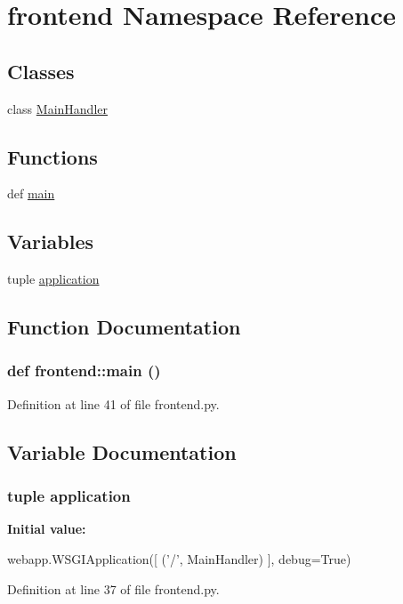 \hypertarget{namespacefrontend}{
\section{frontend Namespace Reference}
\label{namespacefrontend}
}
\subsection*{Classes}
\begin{DoxyCompactItemize}
\item 
class \hyperlink{classfrontend_1_1_main_handler}{MainHandler}
\end{DoxyCompactItemize}
\subsection*{Functions}
\begin{DoxyCompactItemize}
\item 
def \hyperlink{namespacefrontend_a33dc4d3f6979de00900cffcff200db2d}{main}
\end{DoxyCompactItemize}
\subsection*{Variables}
\begin{DoxyCompactItemize}
\item 
tuple \hyperlink{namespacefrontend_a84bbed69751228281d405bfe08a3cc1d}{application}
\end{DoxyCompactItemize}


\subsection{Function Documentation}
\hypertarget{namespacefrontend_a33dc4d3f6979de00900cffcff200db2d}{
\subsubsection[{main}]{\setlength{\rightskip}{0pt plus 5cm}def frontend::main ()}}
\label{namespacefrontend_a33dc4d3f6979de00900cffcff200db2d}


Definition at line 41 of file frontend.py.



\subsection{Variable Documentation}
\hypertarget{namespacefrontend_a84bbed69751228281d405bfe08a3cc1d}{
\subsubsection[{application}]{\setlength{\rightskip}{0pt plus 5cm}tuple {\bf application}}}
\label{namespacefrontend_a84bbed69751228281d405bfe08a3cc1d}
{\bfseries Initial value:}
\begin{DoxyCode}
webapp.WSGIApplication([
    ('/', MainHandler)
], debug=True)
\end{DoxyCode}


Definition at line 37 of file frontend.py.

